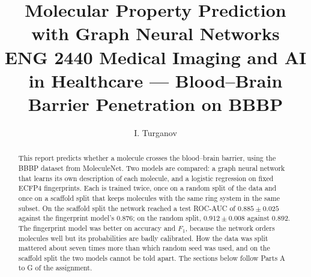 \begin{frontmatter}
%
\title{%
Molecular Property Prediction with Graph Neural Networks\\
\small ENG 2440 Medical Imaging and AI in Healthcare --- Blood--Brain Barrier Penetration on BBBP
}
%
\author[mbzuai]{I. Turganov}
\address[mbzuai]{Mohamed bin Zayed University of Artificial Intelligence, Abu Dhabi, United Arab Emirates.}
%
\renewcommand*{\today}{\DayMonthYearDateFormat\displaydate{dateName}}
%
\begin{abstract}

This report predicts whether a molecule crosses the blood--brain barrier, using the BBBP dataset from MoleculeNet. Two models are compared: a graph neural network that learns its own description of each molecule, and a logistic regression on fixed ECFP4 fingerprints. Each is trained twice, once on a random split of the data and once on a scaffold split that keeps molecules with the same ring system in the same subset. On the scaffold split the network reached a test ROC-AUC of $0.885 \pm 0.025$ against the fingerprint model's $0.876$; on the random split, $0.912 \pm 0.008$ against $0.892$. The fingerprint model was better on accuracy and $F_1$, because the network orders molecules well but its probabilities are badly calibrated. How the data was split mattered about seven times more than which random seed was used, and on the scaffold split the two models cannot be told apart. The sections below follow Parts A to G of the assignment.

\end{abstract}
%
\end{frontmatter}
